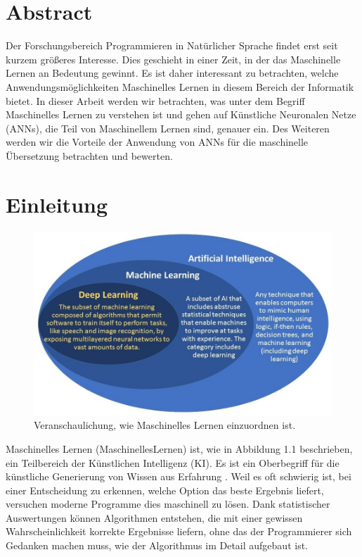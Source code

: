 \documentclass{thesisclass}
\begin{document}
\chapter*{Abstract}
Der Forschungsbereich Programmieren in Natürlicher Sprache findet erst seit kurzem größeres Interesse. Dies geschieht in einer Zeit, in der das Maschinelle Lernen an Bedeutung gewinnt. Es ist daher interessant zu betrachten, welche Anwendungsmöglichkeiten Maschinelles Lernen in diesem Bereich der Informatik bietet. In dieser Arbeit werden wir betrachten, was unter dem Begriff Maschinelles Lernen zu verstehen ist und gehen auf Künstliche Neuronalen Netze (\gls{ANN}s), die Teil von Maschinellem Lernen sind, genauer ein. Des Weiteren werden wir die Vorteile der Anwendung von \gls{ANN}s für die maschinelle Übersetzung betrachten und bewerten.
\newpage
\let\cleardoublepage\relax \chapter{Einleitung}
\begin{figure}[H]
  \center
  \includegraphics[width=\textwidth]{images/machineLearningInAI.jpg}
  \caption{Veranschaulichung, wie Maschinelles Lernen einzuordnen ist. \cite{machineLearning1}}
  \label{fig:Veranschaulichung, wie Maschinelles Lernen einzuordnen ist.}
\end{figure}

Maschinelles Lernen (\gls{MaschinellesLernen}) ist, wie in Abbildung 1.1 beschrieben, ein Teilbereich der K\"unstlichen Intelligenz (\gls{KI}). Es ist ein Oberbegriff für die künstliche Generierung von Wissen aus Erfahrung \cite{eter_2018}. Weil es oft schwierig ist, bei einer Entscheidung zu erkennen, welche Option das beste Ergebnis liefert, versuchen moderne Programme dies maschinell zu lösen. Dank statistischer Auswertungen k\"onnen Algorithmen entstehen, die mit einer gewissen Wahrscheinlichkeit korrekte Ergebnisse liefern, ohne das der Programmierer sich Gedanken machen muss, wie der Algorithmus im Detail aufgebaut ist.\newline
\end{document}
